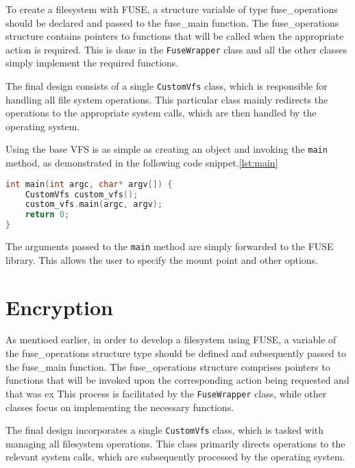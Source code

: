 To create a filesystem with FUSE, a structure variable of type fuse\_operations should be declared and passed to the fuse\_main function.
The fuse\_operations structure contains pointers to functions that will be called when the appropriate action is required.
This is  done in the \texttt{FuseWrapper} class and all the other classes simply implement the required functions.


The final design consists of a single \texttt{CustomVfs} class, which is responsible for handling all file system operations.
This particular class mainly redirects the operations to the appropriate system calls, which are then handled by the operating system.

Using the base VFS is as simple as creating an object and invoking the \texttt{main} method, as demonstrated in the following code snippet.\ref{lst:main}

\begin{lstlisting}[language=c++, basicstyle=\ttfamily\small, caption={Main method of the \texttt{CustomVfs} class.}, label={lst:main}]
int main(int argc, char* argv[]) {
    CustomVfs custom_vfs();
    custom_vfs.main(argc, argv);
    return 0;
}
\end{lstlisting}

The arguments passed to the \texttt{main} method are simply forwarded to the FUSE library.
This allows the user to specify the mount point and other options.


\section{Encryption}\label{sec:encryption}

As mentioed earlier, in order to develop a filesystem using FUSE, a variable of the fuse\_operations structure type should be defined and subsequently passed to the fuse\_main function.
The fuse\_operations structure comprises pointers to functions that will be invoked upon the corresponding action being requested and that was ex
This process is facilitated by the \texttt{FuseWrapper} class, while other classes focus on implementing the necessary functions.

The final design incorporates a single \texttt{CustomVfs} class, which is tasked with managing all filesystem operations.
This class primarily directs operations to the relevant system calls, which are subsequently processed by the operating system.

